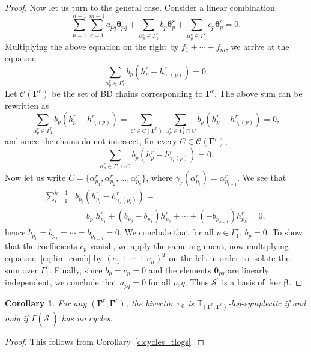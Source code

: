 \documentclass[11pt]{article}
\newcommand{\bbeta}{\boldsymbol{\beta}}
\newcommand{\btheta}{{\boldsymbol{\theta}}}
\newcommand{\bg}{\mathbf{\Gamma}}
\newtheorem{corollary}[theorem]{Corollary}
\theoremstyle{definition}\newtheorem{definition}[theorem]{Definition}
\theoremstyle{definition}\newtheorem{remark}[theorem]{Remark}
\theoremstyle{remark}
\numberwithin{equation}{section}
\begin{document}
\begin{proof}
    Now let us turn to the general case. Consider a linear combination
    \begin{equation}\label{eq:lin_comb}
        \sum_{p=1}^{n-1}\sum_{q = 1}^{m-1} a_{pq} \btheta_{pq} + \sum_{\alpha_p^r \in \Gamma_1^r}b_p\btheta_p^r + \sum_{\alpha_p^c \in \Gamma_1^c} c_p\btheta_p^c = 0.
    \end{equation}
    Multiplying the above equation on the right by $f_1 + \cdots + f_m$, we arrive at the equation
    \begin{equation*}
        \sum_{\alpha_p^r \in \Gamma_1^r}b_p(h_p^r - h_{\gamma_r(p)}^r) = 0.
    \end{equation*}
    Let $\mathcal{C}(\bg^r)$ be the set of BD chains corresponding to $\bg^r$. The above sum can be rewritten as
    \begin{equation*}
        \sum_{\alpha_p^r \in \Gamma_1^r}b_p(h_p^r - h_{\gamma_r(p)}^r) = \sum_{C \in \mathcal{C}(\bg^r)}\sum_{\alpha_p^r \in \Gamma_1^r \cap C}b_p(h_p^r - h_{\gamma_r(p)}^r) = 0,
    \end{equation*}
    and since the chains do not intersect, for every $C \in \mathcal{C}(\bg^r)$,
    \begin{equation*}
        \sum_{\alpha_p^r \in \Gamma_1^r \cap C}b_p(h_p^r - h_{\gamma_r(p)}^r) = 0.
    \end{equation*}
    Now let us write $C= \{\alpha_{p_1}^r,\alpha_{p_2}^r,\ldots,\alpha_{p_k}^r\}$, where $\gamma_r(\alpha_{p_i}^r) = \alpha_{p_{i+1}}^r$. We see that
    \begin{equation*}\begin{split}
        \sum_{i=1}^{k-1}& b_{p_i}(h_{p_i}^r - h_{\gamma_r(p_i)}^r) =\\&= b_{p_1}h_{p_1}^r + (b_{p_2}-b_{p_1})h_{p_2}^r + \cdots +(-b_{p_{k-1}})h_{p_k}^r = 0,
        \end{split}
    \end{equation*}
    hence $b_{p_1} = b_{p_2} = \cdots = b_{p_{k-1}} = 0$. We conclude that for all $p \in \Gamma_1^r$, $b_p = 0$. To show that the coefficients $c_p$ vanish, we apply the same argument, now multiplying equation~\eqref{eq:lin_comb} by $(e_1+\cdots + e_n)^T$ on the left in order to isolate the sum over $\Gamma_1^c$. Finally, since $b_p=c_p=0$ and the elements $\btheta_{pq}$ are linearly independent, we conclude that $a_{pq}=0$ for all $p,q$. Thus $\mathcal{S}^\prime$ is a basis of $\ker \bbeta$.
\end{proof}
\begin{corollary}
    For any $(\bg^r,\bg^c)$, the bivector $\pi_0$ is $\mathbb{T}_{(\bg^r,\bg^c)}$-log-symplectic if and only if $\Gamma(\mathcal{S}^\prime)$ has no cycles.
\end{corollary}
\begin{proof}
    This follows from Corollary~\ref{c:cycles_tlogs}.
\end{proof}
\end{document}
